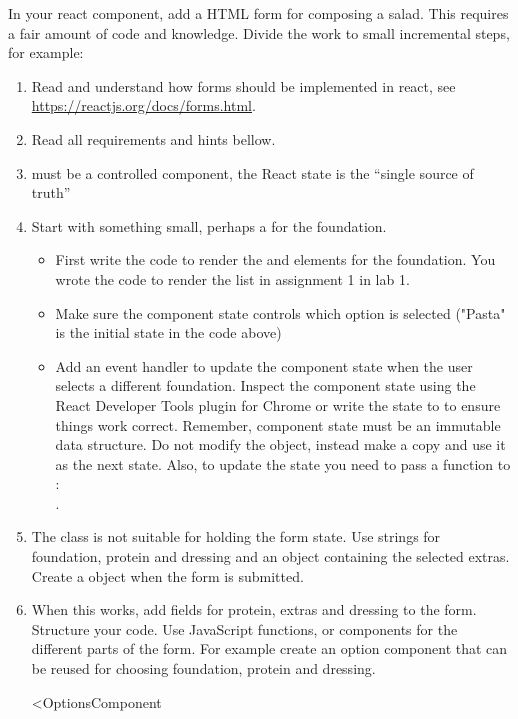 \documentclass[fleqn, article, a4paper]{memoir}
\begin{document}
\begin{Assignments}
\item In your  react component, add a HTML form for composing a salad. This requires a fair amount of code and knowledge. Divide the work to small incremental steps, for example:
\begin{enumerate}
  \item Read and understand how forms should be implemented in react, see \url{https://reactjs.org/docs/forms.html}.
  \item Read all requirements and hints bellow.
  \item {} must be a controlled component, the React state is the ``single source of truth''
  \item Start with something small, perhaps a  for the foundation.
  \begin{itemize}
    \item First write the code to render the  and  elements for the foundation. You wrote the code to render the  list in assignment 1 in lab 1.
    \item Make sure the component state controls which option is selected ("Pasta" is the initial state in the code above)
    \item Add an event handler to update the component state when the user selects a different foundation. Inspect the component state using the React Developer Tools plugin for Chrome or write the state to  to ensure things work correct. Remember, component state must be an immutable data structure. Do not modify the  object, instead make a copy and use it as the next state. Also, to update the state you need to pass a function to :\\ .
  \end{itemize}
      \item The  class is not suitable for holding the form state. Use strings for foundation, protein and dressing and an object containing the selected extras. Create a  object when the form is submitted.
  \item When this works, add fields for protein, extras and dressing to the form. Structure your code. Use JavaScript functions, or components for the different parts of the form. For example create an option component that can be reused for choosing foundation, protein and dressing.
  \begin{Code}
  <OptionsComponent

\end{Code}
\end{enumerate}
\end{Assignments}
\end{document}

